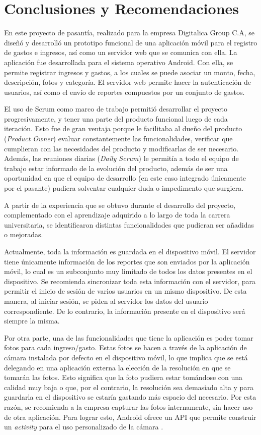 \chapter{Conclusiones y Recomendaciones} \label{chap:conclusiones}

En este proyecto de pasantía, realizado para la empresa Digitalica Group C.A, se diseñó y desarrolló un prototipo funcional de una aplicación móvil para el registro de gastos e ingresos, así como un servidor web que se comunica con ella.  La aplicación fue desarrollada para el sistema operativo Android. Con ella, se permite registrar ingresos y gastos, a los cuales se puede asociar un monto, fecha, descripción, fotos y categoría. El servidor web permite hacer la autenticación de usuarios, así como el envío de reportes compuestos por un conjunto de gastos.

El uso de Scrum como marco de trabajo permitió desarrollar el proyecto progresivamente, y tener una parte del producto funcional luego de cada iteración. Esto fue de gran ventaja porque le facilitaba al dueño del producto (\textit{Product Owner}) evaluar constantemente las funcionalidades, verificar que cumplieran con las necesidades del producto y modificarlas de ser necesario. Además, las reuniones diarias (\textit{Daily Scrum}) le permitía a todo el equipo de trabajo estar informado de la evolución del producto, además de ser una oportunidad en que el equipo de desarrollo (en este caso integrado únicamente por el pasante) pudiera solventar cualquier duda o impedimento que surgiera.

A partir de la experiencia que se obtuvo durante el desarrollo del proyecto, complementado con el aprendizaje adquirido a lo largo de toda la carrera universitaria, se identificaron distintas funcionalidades que pudieran ser añadidas o mejoradas.

Actualmente, toda la información es guardada en el dispositivo móvil. El servidor tiene únicamente información de los reportes que son enviados por la aplicación móvil, lo cual es un subconjunto  muy limitado de todos los datos presentes en el dispositivo. Se recomienda sincronizar toda esta información con el servidor, para permitir el inicio de sesión de varios usuarios en un mismo dispositivo. De esta manera, al iniciar sesión, se piden al servidor los datos del usuario correspondiente. De lo contrario, la información presente en el dispositivo será siempre la misma. 

Por otra parte, una de las funcionalidades que tiene la aplicación es poder tomar fotos para cada ingreso/gasto. Estas fotos se hacen a través de la aplicación de cámara instalada por defecto en el dispositivo móvil, lo que implica que se está delegando en una aplicación externa la elección de la resolución en que se tomarán las fotos. Esto significa que la foto pudiera estar tomándose con una calidad muy baja o que, por el contrario, la resolución sea demasiado alta y para guardarla en el dispositivo se estaría gastando más espacio del necesario. Por esta razón, se recomienda a la empresa capturar las fotos internamente, sin hacer uso de otra aplicación. Para lograr esto, Android ofrece un API que permite construir un \textit{activity} para el uso personalizado de la cámara \cite{AND4}.

